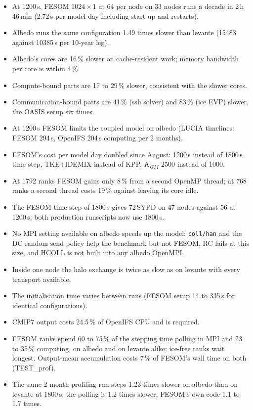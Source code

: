 \documentclass[11pt,a4paper]{article}
\begin{document}
\begin{itemize}
\item At 1200\,s, FESOM $1024\times1$ at 64 per node on 33 nodes runs a decade in 2\,h\,46\,min (2.72\,s per model day including start-up and restarts).
\item Albedo runs the same configuration 1.49 times slower than levante (15483 against 10385\,s per 10-year leg).
\item Albedo's cores are 16\,\% slower on cache-resident work; memory bandwidth per core is within 4\,\%.
\item Compute-bound parts are 17 to 29\,\% slower, consistent with the slower cores.
\item Communication-bound parts are 41\,\% (ssh solver) and 83\,\% (ice EVP) slower, the OASIS setup six times.
\item At 1200\,s FESOM limits the coupled model on albedo (LUCIA timelines: FESOM 294\,s, OpenIFS 204\,s computing per 2 months).
\item FESOM's cost per model day doubled since August: 1200\,s instead of 1800\,s time step, TKE+IDEMIX instead of KPP, $K_{GM}$ 2500 instead of 1000.
\item At 1792 ranks FESOM gains only 8\,\% from a second OpenMP thread; at 768 ranks a second thread costs 19\,\% against leaving its core idle.
\item The FESOM time step of 1800\,s gives 72\,SYPD on 47 nodes against 56 at 1200\,s; both production runscripts now use 1800\,s.
\item No MPI setting available on albedo speeds up the model: \texttt{coll/han} and the DC random send policy help the benchmark but not FESOM, RC fails at this size, and HCOLL is not built into any albedo OpenMPI.
\item Inside one node the halo exchange is twice as slow as on levante with every transport available.
\item The initialisation time varies between runs (FESOM setup 14 to 335\,s for identical configurations).
\item CMIP7 output costs 24.5\,\% of OpenIFS CPU and is required.
\item FESOM ranks spend 60 to 75\,\% of the stepping time polling in MPI and 23 to 35\,\% computing, on albedo and on levante alike; ice-free ranks wait longest. Output-mean accumulation costs 7\,\% of FESOM's wall time on both (TEST\_prof).
\item The same 2-month profiling run steps 1.23 times slower on albedo than on levante at 1800\,s; the polling is 1.2 times slower, FESOM's own code 1.1 to 1.7 times.

\end{itemize}
\end{document}
